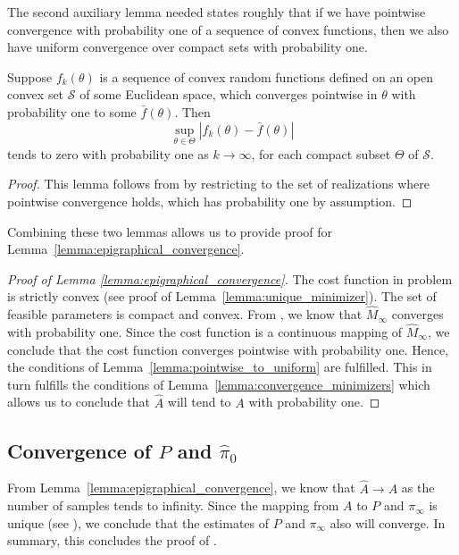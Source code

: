 \documentclass[journal]{IEEEtran}
\newcommand{\pii}{\pi_\infty}
\begin{document}
The second auxiliary lemma needed states roughly that if we have pointwise
convergence with probability one of a sequence of convex functions, then we
also have uniform convergence over compact sets with probability one.
\begin{lemma}
    Suppose $f_k(\theta)$ is a sequence of convex random functions defined on
    an open convex set $\mathcal{S}$ of some Euclidean space, which converges
    pointwise in $\theta$ with probability one to some $\bar f(\theta)$.
    Then
    \begin{equation}
        \sup_{\theta \in \Theta} | f_k(\theta) - \bar f(\theta) |
        \label{eq:sup_fk_f}
    \end{equation}
    tends to zero with probability one as $k \to \infty$, for each compact subset
    $\Theta$ of $\mathcal{S}$.
    \label{lemma:pointwise_to_uniform}
\end{lemma}
\begin{proof}
    This lemma follows from \cite[Theorem 10.8]{rockafellar_convex_1970} by restricting to
    the set of realizations where pointwise convergence holds, which has probability one
    by assumption.
\end{proof}
Combining these two lemmas allows us to provide proof for
Lemma~\ref{lemma:epigraphical_convergence}.
\begin{proof}[Proof of Lemma \ref{lemma:epigraphical_convergence}]
    The cost function in problem  is strictly convex (see
    proof of Lemma~\ref{lemma:unique_minimizer}). The set
    of feasible parameters is compact and convex. From
    , we know that $\hat M_\infty$ converges with
    probability one. Since the cost function is a continuous mapping of $\hat
    M_\infty$, we conclude that the cost function converges pointwise with
    probability one. Hence, the conditions of
    Lemma~\ref{lemma:pointwise_to_uniform} are fulfilled.  This in turn
    fulfills the conditions of Lemma~\ref{lemma:convergence_minimizers} which
    allows us to conclude that $\hat A$ will tend to $A$ with probability one.
\end{proof}

\subsection{Convergence of $\hat P$ and $\hat \pi_0$}

From Lemma~\ref{lemma:epigraphical_convergence}, we know that $\hat
A \rightarrow A$ as the number of samples tends to infinity. Since the mapping
from $A$ to $P$ and $\pii$ is unique (see ), we
conclude that the estimates of $P$ and $\pii$ also will converge. In summary,
this concludes the proof of .
\end{document}
